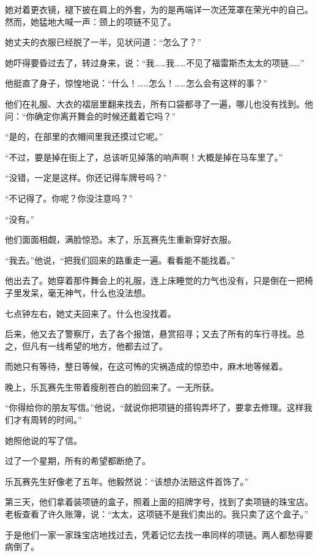 \documentclass[12pt,UTF-8,openany]{ctexbook}
\begin{document}
\begin{large}
    她对着更衣镜，褪下披在肩上的外套，为的是再端详一次还笼罩在荣光中的自己。然而，她猛地大喊一声：颈上的项链不见了。
    
    她丈夫的衣服已经脱了一半，见状问道：“怎么了？”
    
    她吓得要昏过去了，转过身来，说：“我……我……不见了福雷斯杰太太的项链……”
    
    他挺直了身子，惊惶地说：“什么！……怎么！……怎么会有这样的事？”
    
    他们在礼服、大衣的褶层里翻来找去，所有口袋都寻了一遍，哪儿也没有找到。他问：“你确定你离开舞会的时候还戴着它吗？”
    
    “是的，在部里的衣帽间里我还摸过它呢。”
    
    “不过，要是掉在街上了，总该听见掉落的响声啊！大概是掉在马车里了。”
    
    “没错，一定是这样。你还记得车牌号吗？”
    
    “不记得了。你呢？你没注意吗？”
    
    “没有。”
    
    他们面面相觑，满脸惊恐。末了，乐瓦赛先生重新穿好衣服。
    
    “我去。”他说，“把我们回来的路重走一遍。看看能不能找着。”
    
    他出去了。她穿着那件舞会上的礼服，连上床睡觉的力气也没有，只是倒在一把椅子里发呆，毫无神气，什么也没法想。
    
    七点钟左右，她丈夫回来了。什么也没找着。
    
    后来，他又去了警察厅，去了各个报馆，悬赏招寻；又去了所有的车行寻找。总之，但凡有一线希望的地方，他都去过了。
    
    而她只有等待，整日等候，在这可怖的灾祸造成的惊恐中，麻木地等候着。
    
    晚上，乐瓦赛先生带着瘦削苍白的脸回来了。一无所获。
    
    “你得给你的朋友写信。”他说，“就说你把项链的搭钩弄坏了，要拿去修理。这样我们才有周转的时间。”
    
    她照他说的写了信。
    
    过了一个星期，所有的希望都断绝了。
    
    乐瓦赛先生好像老了五年。他毅然说：“该想办法赔这件首饰了。”
    
    第三天，他们拿着装项链的盒子，照着上面的招牌字号，找到了卖项链的珠宝店。老板查看了许久账簿，说：“太太，这项链不是我们卖出的。我只卖了这个盒子。”
    
    于是他们一家一家珠宝店地找过去，凭着记忆去找一串同样的项链。两人都愁得要病倒了。
    

\end{large}
\end{document}
